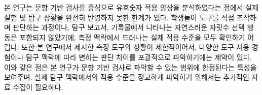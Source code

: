 본 연구는 문항 기반 검사를 중심으로 유효숫자 적용 양상을 분석하였다는 점에서
실제 실험 및 탐구 상황을 완전히 반영하지 못한 한계가 있다.
%
학생들이 도구를 직접 조작하며 판단하는 과정이나, 탐구 보고서, 기록물에서 나타나는
자연스러운 자릿수 선택 행동은 포함되지 않았기에,
측정 맥락에서 드러나는 실제 적용 수준을 모두 확인하기 어렵다.
%
또한 본 연구에서 제시한 측정 도구와 상황이 제한적이어서,
다양한 도구 사용 경험이나 탐구 맥락에 따라 변하는 판단 차이를 포괄적으로 파악하기에는 제약이 있다.
%
이와 같은 점은 본 연구가 문항 기반 검사로 파악할 수 있는 범위에 한정된다는 특성을 보여주며,
실제 탐구 맥락에서의 적용 수준을 정교하게 파악하기 위해서는 추가적인 자료 수집이 필요하다.